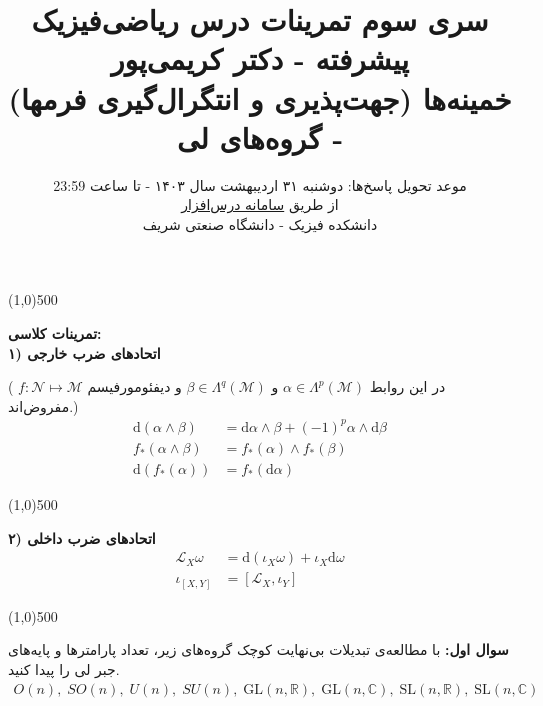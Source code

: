 \documentclass{article}
\title{ سری سوم تمرینات درس ریاضی‌فیزیک پیشرفته - دکتر کریمی‌پور
	\\
	\vspace{-1em}
	{\Large
		خمینه‌ها (جهت‌پذیری و انتگرال‌گیری فرمها) - گروه‌های لی}
		\\
		
}
\author{موعد تحویل پاسخ‌ها:
	دوشنبه ۳۱ اردیبهشت سال ۱۴۰۳ - تا ساعت 23:59
	\\
	از طریق 
	\href{https://cw.sharif.edu/}{سامانه درس‌افزار}
	\\
	دانشکده فیزیک - دانشگاه صنعتی شریف
}\date{}
\begin{document}
	\maketitle
	
	\def\endline{		{
			\vspace{-2.5em}
			\color{cyan}
			\begin{center} \linethickness{1mm}\line(1,0){500} \end{center}
	}}
	\def\thinendline{		{
			\vspace{-2.5em}
			\color{purple}
			\begin{center} \linethickness{0.5mm}\line(1,0){500} \end{center}
	}}
	\vspace{-2em}
	\endline
	
	\noindent
	\textbf{تمرینات کلاسی:}\\
	\textbf{۱) اتحادهای ضرب خارجی}
	
	\noindent
	(
	در این روابط
	$\alpha \in \Lambda^p (\mathcal{M})$
	و 
	$\beta \in \Lambda^q (\mathcal{M})$
	و دیفئومورفیسم 
	$f:\mathcal{N} \longmapsto \mathcal{M}$
	مفروض‌اند.)
	\begin{equation}
		\begin{aligned}
			\text{d}(\alpha \wedge \beta) &= \text{d}\alpha \wedge \beta + (-1)^p \alpha \wedge \text{d}\beta \\
			f_*(\alpha \wedge \beta) &= f_*(\alpha) \wedge f_*(\beta) \\
			\text{d}(f_*(\alpha))                     &= 	f_*(\text{d}\alpha)
		\end{aligned}
	\end{equation}
	
	\vspace{-1em}
	
	
	\thinendline
	\vspace{-1em}
	\textbf{۲) اتحاد‌های ضرب داخلی}
	\begin{equation}
		\begin{aligned}
			\mathcal{L}_{X}\omega &= \text{d}(\iota_X\omega)  + \iota_X\text{d}\omega \\ 
			\iota_{[X,Y]} &= [\mathcal{L}_X,\iota_Y]
		\end{aligned}
	\end{equation}
	
	\vspace{-1em}
	\endline
	
	\vspace{-1em}
	\textbf{سوال اول:}
	با مطالعه‌ی تبدیلات بی‌نهایت کوچک گروه‌های زیر، تعداد پارامترها و پایه‌های جبر لی را پیدا کنید.
	\begin{equation*}
		\begin{aligned}
			O(n),\; SO(n),\; U(n),\; SU(n),\;\text{GL}(n,\mathbb{R}),\; \text{GL}(n,\mathbb{C}) ,\; \text{SL}(n,\mathbb{R}),\; \text{SL}(n,\mathbb{C})
		\end{aligned}
	\end{equation*}
	
\end{document}
